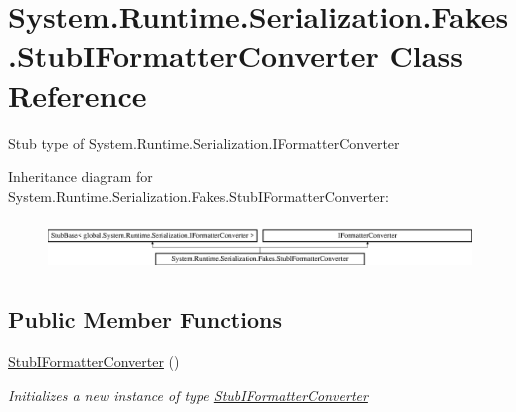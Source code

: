 \hypertarget{class_system_1_1_runtime_1_1_serialization_1_1_fakes_1_1_stub_i_formatter_converter}{\section{System.\-Runtime.\-Serialization.\-Fakes.\-Stub\-I\-Formatter\-Converter Class Reference}
\label{class_system_1_1_runtime_1_1_serialization_1_1_fakes_1_1_stub_i_formatter_converter}
}


Stub type of System.\-Runtime.\-Serialization.\-I\-Formatter\-Converter 


Inheritance diagram for System.\-Runtime.\-Serialization.\-Fakes.\-Stub\-I\-Formatter\-Converter\-:\begin{figure}[H]
\begin{center}
\leavevmode
\includegraphics[height=1.352657cm]{class_system_1_1_runtime_1_1_serialization_1_1_fakes_1_1_stub_i_formatter_converter}
\end{center}
\end{figure}
\subsection*{Public Member Functions}
\begin{DoxyCompactItemize}
\item 
\hyperlink{class_system_1_1_runtime_1_1_serialization_1_1_fakes_1_1_stub_i_formatter_converter_ab25e33ef071b68d1149de4b6434eb205}{Stub\-I\-Formatter\-Converter} ()
\begin{DoxyCompactList}\small\item\em Initializes a new instance of type \hyperlink{class_system_1_1_runtime_1_1_serialization_1_1_fakes_1_1_stub_i_formatter_converter}{Stub\-I\-Formatter\-Converter}\end{DoxyCompactList}\end{DoxyCompactItemize}
